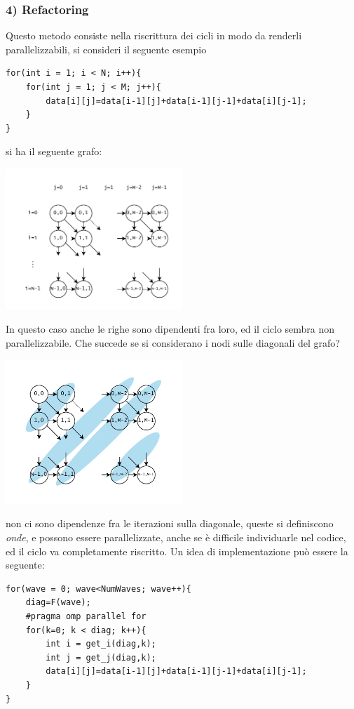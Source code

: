\documentclass[10pt, letterpaper]{report}
\begin{document}
\subsubsection{4) Refactoring} 
Questo metodo consiste nella riscrittura dei cicli in modo da renderli parallelizzabili, si consideri il seguente esempio
\begin{lstlisting}[style=CStyle]
for(int i = 1; i < N; i++){
    for(int j = 1; j < M; j++){
        data[i][j]=data[i-1][j]+data[i-1][j-1]+data[i][j-1];
    }
}
\end{lstlisting}
si ha il seguente grafo:\begin{center}
    \includegraphics[width=0.5\textwidth ]{images/grafoIterazioni2.drawio.pdf}
\end{center}
In questo caso anche le righe sono dipendenti fra loro, ed il ciclo sembra non parallelizzabile. Che succede se si considerano i nodi sulle diagonali del grafo?
\begin{center}
    \includegraphics[width=0.5\textwidth ]{images/grafoIterazioni3.drawio.pdf}
\end{center}
non ci sono dipendenze fra le iterazioni sulla diagonale, queste si definiscono \textit{onde}, e possono essere parallelizzate, anche se è difficile individuarle nel codice, ed il ciclo va completamente riscritto. Un idea di implementazione può essere la seguente:
\begin{lstlisting}[style=CStyle]
for(wave = 0; wave<NumWaves; wave++){
    diag=F(wave);
    #pragma omp parallel for 
    for(k=0; k < diag; k++){
        int i = get_i(diag,k);
        int j = get_j(diag,k);
        data[i][j]=data[i-1][j]+data[i-1][j-1]+data[i][j-1];
    }
}
\end{lstlisting}
\end{document}
